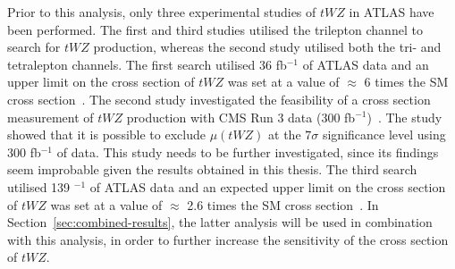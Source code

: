 Prior to this analysis, only three experimental studies of $tWZ$ in ATLAS have been performed. The first and third studies utilised the trilepton channel to search for $tWZ$ production, whereas the second study utilised both the tri- and tetralepton channels. The first search utilised 36 fb$^{-1}$ of ATLAS data and an upper limit on the cross section of $tWZ$ was set at a value of $\approx$ 6 times the SM cross section~\cite{twz_3_lep}. The second study investigated the feasibility of a cross section measurement of $tWZ$ production with CMS Run 3 data (300 fb$^{-1}$)~\cite{Tschida:2020ftz}. The study showed that it is possible to exclude $\mu (tWZ)$ at the $7\sigma$ significance level using 300 fb$^{-1}$ of data. This study needs to be further investigated, since its findings seem improbable given the results obtained in this thesis. The third search utilised 139 $^{-1}$ of ATLAS data and an expected upper limit on the cross section of $tWZ$ was set at a value of $\approx$ 2.6 times the SM cross section~\cite{ben-thesis}. In Section~\ref{sec:combined-results}, the latter analysis will be used in combination with this analysis, in order to further increase the sensitivity of the cross section of $tWZ$.






